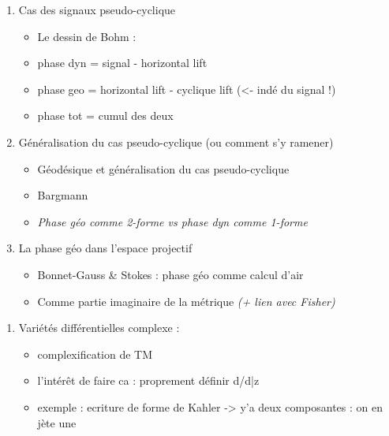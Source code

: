 \begin{enumerate}[label=\arabic* --- ]
	
	\item Cas des signaux pseudo-cyclique
	\begin{itemize} \normalfont
		
		\item Le dessin de Bohm :
		
		\item phase dyn =  signal - horizontal lift
		
		\item phase geo = horizontal lift - cyclique lift (<- indé du signal !)
		
		\item phase tot = cumul des deux
	\end{itemize}
	
	\item Généralisation du cas pseudo-cyclique (ou comment s'y ramener)
	\begin{itemize} \normalfont
		
		\item Géodésique et généralisation du cas pseudo-cyclique
		
		\item Bargmann 
		
		\item \textit{Phase géo comme 2-forme vs phase dyn comme 1-forme}
	\end{itemize}
	
	\item La phase géo dans l'espace projectif
	\begin{itemize} \normalfont
		
		\item Bonnet-Gauss  \& Stokes : phase géo comme calcul d'air
		
		\item Comme partie imaginaire de la métrique \textit{(+ lien avec Fisher)}
		
	\end{itemize}
\end{enumerate}

\begin{enumerate}[label=\Alph* --- ]
	\item Variétés différentielles complexe :
	\begin{itemize}
		
		\item complexification de TM
		
		\item l'intérêt de faire ca : proprement définir d/d\bar{z}
		
		\item exemple : ecriture de forme de Kahler -> y'a deux composantes : on en jète une 
		
	\end{itemize}
\end{enumerate}




